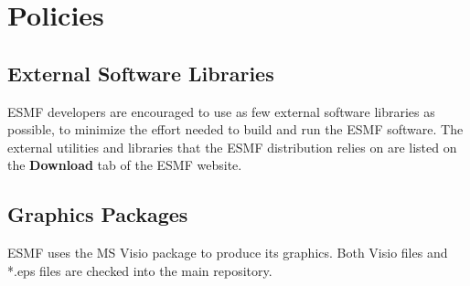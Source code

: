
\section{Policies}

\subsection{External Software Libraries}
\label{sec:lib}

ESMF developers are encouraged to use as few external
software libraries as possible, to minimize the effort
needed to build and run the ESMF software.  The external
utilities and libraries that the ESMF distribution relies
on are listed on the {\bf Download} tab of the ESMF website.  

\subsection{Graphics Packages}

ESMF uses the MS Visio package to produce its graphics.
Both Visio files and *.eps files are checked into the 
main repository.



